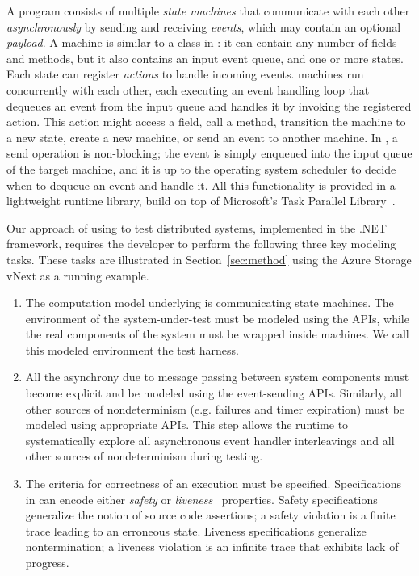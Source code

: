 A \psharp program consists of multiple \emph{state machines} that communicate with each other \emph{asynchronously} by sending and receiving \emph{events}, which may contain an optional \emph{payload}. A \psharp machine is similar to a class in \csharp: it can contain any number of fields and methods, but it also contains an input event queue, and one or more states. Each state can register \emph{actions} to handle incoming events. \psharp machines run concurrently with each other, each executing an event handling loop that dequeues an event from the input queue and handles it by invoking the registered action. This action might access a field, call a method, transition the machine to a new state, create a new machine, or send an event to another machine. In \psharp, a send operation is non-blocking; the event is simply enqueued into the input queue of the target machine, and it is up to the operating system scheduler to decide when to dequeue an event and handle it. All this functionality is provided in a lightweight runtime library, build on top of Microsoft's Task Parallel Library~\cite{leijen2009tpl}.

Our approach of using \psharp to test distributed systems, implemented in the .NET framework, requires the developer to perform the following three key modeling tasks. These tasks are illustrated in Section~\ref{sec:method} using the Azure Storage vNext as a running example.

\begin{enumerate}
\item
The computation model underlying \psharp is communicating state machines. The environment of the system-under-test must be modeled using the \psharp APIs, while the real components of the system must be wrapped inside \psharp machines. We call this modeled environment the \psharp test harness.

\item
All the asynchrony due to message passing between system components must become explicit and be modeled using the \psharp event-sending APIs. Similarly, all other sources of nondeterminism (e.g. failures and timer expiration) must be modeled using appropriate \psharp APIs. This step allows the \psharp runtime to systematically explore all asynchronous event handler interleavings and all other sources of nondeterminism during testing.

\item
The criteria for correctness of an execution must be specified. Specifications in \psharp can encode either \emph{safety} or \emph{liveness}~\cite{lamport1977proving} properties. Safety specifications generalize the notion of source code assertions; a safety violation is a finite trace leading to an erroneous state. Liveness specifications generalize nontermination; a liveness violation is an infinite trace that exhibits lack of progress.
\end{enumerate}

